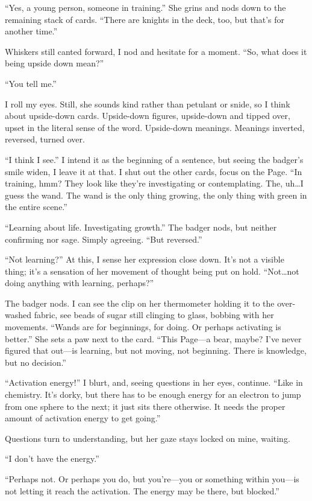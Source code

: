 ``Yes, a young person, someone in training.'' She grins and nods down to the remaining stack of cards. ``There are knights in the deck, too, but that's for another time.''

Whiskers still canted forward, I nod and hesitate for a moment. ``So, what does it being upside down mean?''

``You tell me.''

I roll my eyes. Still, she sounds kind rather than petulant or snide, so I think about upside-down cards. Upside-down figures, upside-down and tipped over, upset in the literal sense of the word. Upside-down meanings. Meanings inverted, reversed, turned over.

``I think I see.'' I intend it as the beginning of a sentence, but seeing the badger's smile widen, I leave it at that. I shut out the other cards, focus on the Page. ``In training, hmm? They look like they're investigating or contemplating. The, uh\ldots{}I guess the wand. The wand is the only thing growing, the only thing with green in the entire scene.''

``Learning about life. Investigating growth.'' The badger nods, but neither confirming nor sage. Simply agreeing. ``But reversed.''

``Not learning?'' At this, I sense her expression close down. It's not a visible thing; it's a sensation of her movement of thought being put on hold. ``Not\ldots{}not doing anything with learning, perhaps?''

The badger nods. I can see the clip on her thermometer holding it to the over-washed fabric, see beads of sugar still clinging to glass, bobbing with her movements. ``Wands are for beginnings, for doing. Or perhaps activating is better.'' She sets a paw next to the card. ``This Page---a bear, maybe? I've never figured that out---is learning, but not moving, not beginning. There is knowledge, but no decision.''

``Activation energy!'' I blurt, and, seeing questions in her eyes, continue. ``Like in chemistry. It's dorky, but there has to be enough energy for an electron to jump from one sphere to the next; it just sits there otherwise. It needs the proper amount of activation energy to get going.''

Questions turn to understanding, but her gaze stays locked on mine, waiting.

``I don't have the energy.''

``Perhaps not. Or perhaps you do, but you're---you or something within you---is not letting it reach the activation. The energy may be there, but blocked.''

